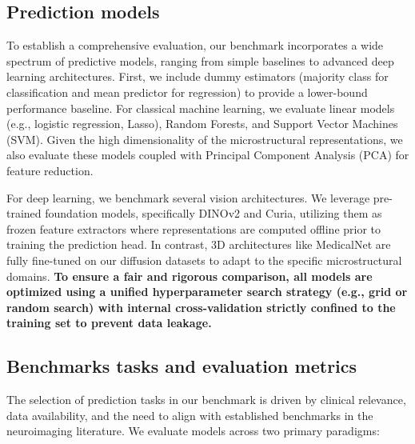 \subsection{Prediction models}
To establish a comprehensive evaluation, our benchmark incorporates a wide 
spectrum of predictive models, ranging from simple baselines to advanced deep 
learning architectures. First, we include dummy estimators (majority class for 
classification and mean predictor for regression) to provide a lower-bound 
performance baseline. For classical machine learning, we evaluate linear models 
(e.g., logistic regression, Lasso), Random Forests, and Support Vector Machines 
(SVM). Given the high dimensionality of the microstructural representations, we 
also evaluate these models coupled with Principal Component Analysis (PCA) for 
feature reduction. 

For deep learning, we benchmark several vision architectures. We leverage 
pre-trained foundation models, specifically DINOv2 and Curia, utilizing them as 
frozen feature extractors where representations are computed offline prior to 
training the prediction head. In contrast, 3D architectures like MedicalNet are 
fully fine-tuned on our diffusion datasets to adapt to the specific 
microstructural domains. \textbf{To ensure a fair and rigorous comparison, all models 
are optimized using a unified hyperparameter search strategy (e.g., grid or 
random search) with internal cross-validation strictly confined to the training 
set to prevent data leakage.}


\subsection{Benchmarks tasks and evaluation metrics}
The selection of prediction tasks in our benchmark is driven by clinical relevance, data availability, 
and the need to align with established benchmarks in the neuroimaging literature. We evaluate models 
across two primary paradigms:

